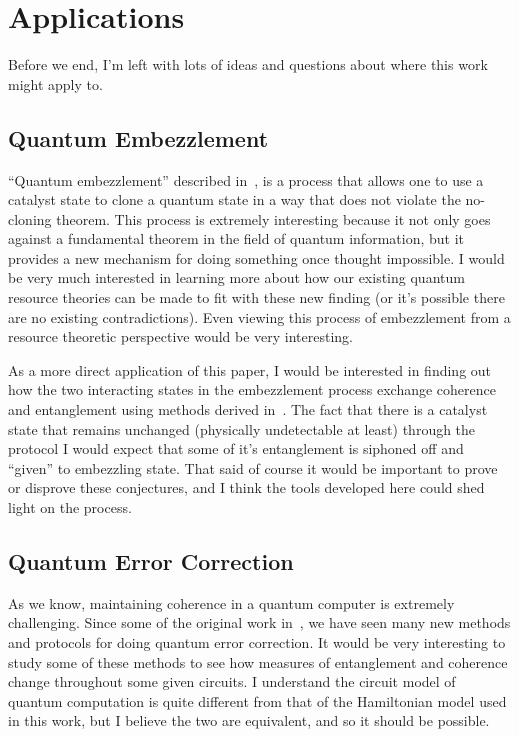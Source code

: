 \documentclass[11pt,english]{article}
\theoremstyle{definition}
\begin{document}
\section{Applications}

Before we end, I'm left with lots of ideas and questions about where this work might apply to.

\subsection{Quantum Embezzlement}
``Quantum embezzlement'' described in~\cite{embezzlement,self-embezzlement}, is a process that allows one to use a catalyst state to clone a quantum state in a way that does not violate the no-cloning theorem. This process is extremely interesting because it not only goes against a fundamental theorem in the field of quantum information, but it provides a new mechanism for doing something once thought impossible. I would be very much interested in learning more about how our existing quantum resource theories can be made to fit with these new finding (or it's possible there are no existing contradictions). Even viewing this process of embezzlement from a resource theoretic perspective would be very interesting.

As a more direct application of this paper, I would be interested in finding out how the two interacting states in the embezzlement process exchange coherence and entanglement using methods derived in~\cite{dynamic-entropies}. The fact that there is a catalyst state that remains unchanged (physically undetectable at least) through the protocol I would expect that some of it's entanglement is siphoned off and ``given'' to embezzling state. That said of course it would be important to prove or disprove these conjectures, and I think the tools developed here could shed light on the process.

\subsection{Quantum Error Correction}
As we know, maintaining coherence in a quantum computer is extremely challenging. Since some of the original work in~\cite{error-correction}, we have seen many new methods and protocols for doing quantum error correction. It would be very interesting to study some of these methods to see how measures of entanglement and coherence change throughout some given circuits. I understand the circuit model of quantum computation is quite different from that of the Hamiltonian model used in this work, but I believe the two are equivalent, and so it should be possible.

\clearpage


\end{document}
